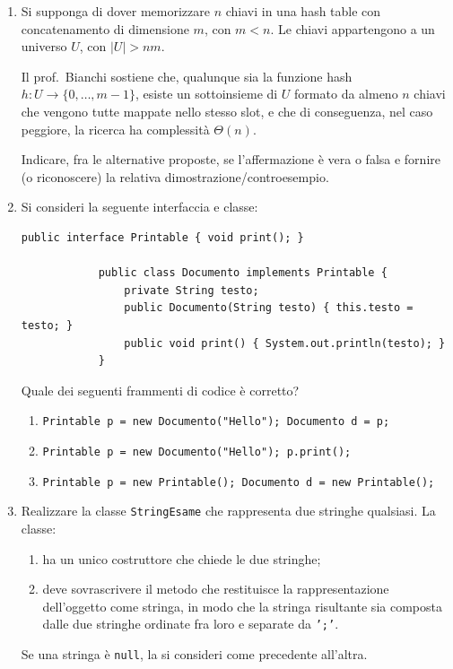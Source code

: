 	\begin{enumerate}
		
		\item Si supponga di dover memorizzare $n$ chiavi in una hash table con concatenamento di dimensione $m$, con $m<n$. Le chiavi appartengono a un universo $U$, con $|U|>nm$.
		
		Il prof.\ Bianchi sostiene che, qualunque sia la funzione hash $h:U\to\{0,\dots,m-1\}$, esiste un sottoinsieme di $U$ formato da almeno $n$ chiavi che vengono tutte mappate nello stesso slot, e che di conseguenza, nel caso peggiore, la ricerca ha complessità $\Theta(n)$.
		
		Indicare, fra le alternative proposte, se l'affermazione è vera o falsa e fornire (o riconoscere) la relativa dimostrazione/controesempio.
		
		\item Si consideri la seguente interfaccia e classe:
		\begin{lstlisting}[style=java]
			public interface Printable { void print(); }
			
			public class Documento implements Printable {
				private String testo;
				public Documento(String testo) { this.testo = testo; }
				public void print() { System.out.println(testo); }
			}
		\end{lstlisting}
		Quale dei seguenti frammenti di codice è corretto?
		\begin{enumerate}[label=(\alph*)]
			\item \texttt{Printable p = new Documento("Hello"); Documento d = p;}
			\item \texttt{Printable p = new Documento("Hello"); p.print();}
			\item \texttt{Printable p = new Printable(); Documento d = new Printable();}
		\end{enumerate}
		
		\item Realizzare la classe \texttt{StringEsame} che rappresenta due stringhe qualsiasi. La classe:
		\begin{enumerate}
			\item ha un unico costruttore che chiede le due stringhe;
			\item deve sovrascrivere il metodo che restituisce la rappresentazione dell'oggetto come stringa, in modo che la stringa risultante sia composta dalle due stringhe ordinate fra loro e separate da \texttt{';'}.
		\end{enumerate}
		Se una stringa è \texttt{null}, la si consideri come precedente all'altra.
		

\end{enumerate}
